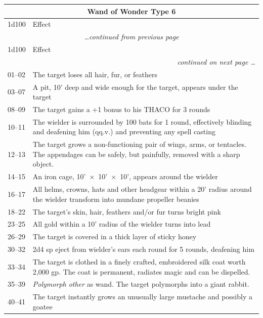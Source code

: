 \noindent \begin{longtable}{|p{}|p{}|}
\multicolumn{2}{c}{Wand of Wonder Type 6} \\
\hline
1d100	& Effect \\
\hline\hline
\endfirsthead
\multicolumn{2}{c}{\textit{\ldots continued from previous page}} \\
\hline
1d100	& Effect \\
\hline\hline
\endhead
\hline
\multicolumn{2}{r}{\textit{continued on next page \ldots}}\\
\endfoot
\hline
\endlastfoot
\rowcolor[gray]{.9}01--02	& The target loses all hair, fur, or feathers \\
03--07	& A pit, 10' deep and wide enough for the target, appears under the target  \\
\rowcolor[gray]{.9}08--09	& The target gains a +1 bonus to his THACO for 3 rounds \\
10--11	& The wielder is surrounded by 100 bats for 1 round, effectively blinding and deafening him (qq.v.) and preventing any spell casting \\
\rowcolor[gray]{.9}12--13	& The target grows a non-functioning pair of wings, arms, or tentacles.  The appendages can be safely, but painfully, removed with a sharp object. \\
14--15	& An iron cage, 10'~$\times$~10'~$\times$~10', appears around the wielder \\
\rowcolor[gray]{.9}16--17	& All helms, crowns, hats and other headgear within a 20' radius around the wielder transform into mundane propeller beanies \\
18--22	& The target's skin, hair, feathers and/or fur turns bright pink \\
\rowcolor[gray]{.9}23--25	& All gold within a 10' radius of the wielder turns into lead \\
26--29	& The target is covered in a thick layer of sticky honey \\
\rowcolor[gray]{.9}30--32	& 2d4 sp eject from wielder's ears each round for 5 rounds, deafening him \\
33--34	& The target is clothed in a finely crafted, embroidered silk coat worth 2,000 gp.  The coat is permanent, radiates magic and can be dispelled. \\
\rowcolor[gray]{.9}35--39	& \textit{Polymorph other} as wand.  The target polymorphs into a giant rabbit. \\
40--41	& The target instantly grows an unusually large mustache and possibly a goatee \\

\end{longtable}
